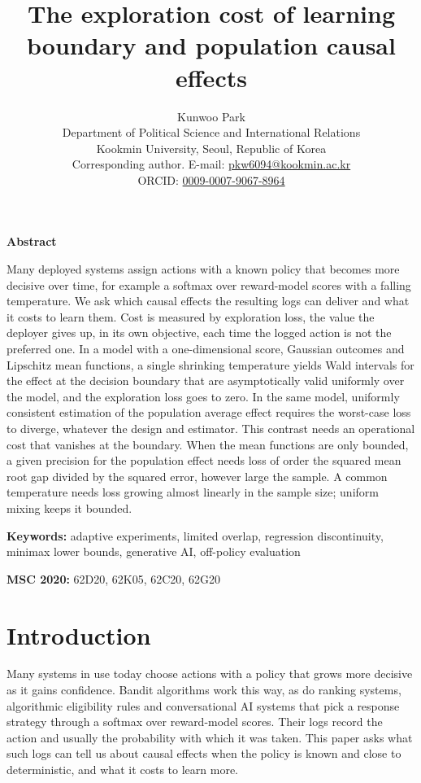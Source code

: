 \documentclass[12pt]{article}
\title{The exploration cost of learning boundary and population causal effects}
\author{Kunwoo Park\\[4pt]
\normalsize Department of Political Science and International Relations\\
\normalsize Kookmin University, Seoul, Republic of Korea\\
\normalsize Corresponding author. E-mail:
\href{mailto:pkw6094@kookmin.ac.kr}{pkw6094@kookmin.ac.kr}\\
\normalsize ORCID: \href{https://orcid.org/0009-0007-9067-8964}{0009-0007-9067-8964}}
\date{}
\theoremstyle{definition}
\theoremstyle{remark}
\renewenvironment{abstract}{\begin{center}\textbf{Abstract}\end{center}\par\noindent}{\par}
\begin{document}
\maketitle

\begin{abstract}
Many deployed systems assign actions with a known policy that becomes more
decisive over time, for example a softmax over reward-model scores with a falling
temperature. We ask which causal effects the resulting logs can deliver and what it
costs to learn them. Cost is measured by exploration loss, the value the deployer
gives up, in its own objective, each time the logged action is not the preferred
one. In a model with a one-dimensional score, Gaussian outcomes and Lipschitz mean
functions, a single shrinking temperature yields Wald intervals for the effect at
the decision boundary that are asymptotically valid uniformly over the model, and
the exploration loss goes to zero. In the same model, uniformly consistent
estimation of the population average effect requires the worst-case loss to
diverge, whatever the design and estimator. This contrast needs an operational cost
that vanishes at the boundary. When the mean functions are only bounded, a given
precision for the population effect needs loss of order the squared mean root gap
divided by the squared error, however large the sample. A common temperature needs
loss growing almost linearly in the sample size; uniform mixing keeps it bounded.
\end{abstract}

\noindent\textbf{Keywords:} adaptive experiments, limited overlap, regression
discontinuity, minimax lower bounds, generative AI, off-policy evaluation

\noindent\textbf{MSC 2020:} 62D20, 62K05, 62C20, 62G20

\section{Introduction}\label{sec:intro}

Many systems in use today choose actions with a policy that grows more decisive as
it gains confidence. Bandit algorithms work this way, as do ranking systems,
algorithmic eligibility rules and conversational AI systems that pick a response
strategy through a softmax over reward-model scores. Their logs record the action
and usually the probability with which it was taken. This paper asks what such logs
can tell us about causal effects when the policy is known and close to
deterministic, and what it costs to learn more.
\end{document}

